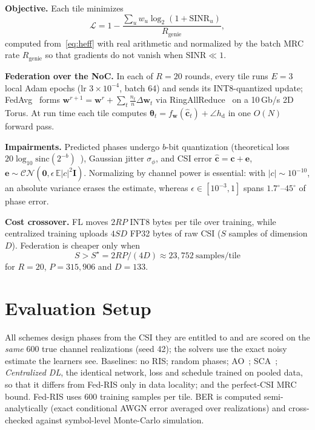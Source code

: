 \documentclass[conference]{IEEEtran}
\newcommand{\fedris}{Fed-RIS\xspace}
\begin{document}
\textbf{Objective.} Each tile minimizes
\begin{equation}
\mathcal{L} = 1 - \frac{\sum_u w_u \log_2(1+\mathrm{SINR}_u)}{R_\text{genie}},
\label{eq:loss}
\end{equation}
computed from~\eqref{eq:heff} with real arithmetic and normalized by the batch MRC rate $R_\text{genie}$ so that gradients do not vanish when $\mathrm{SINR}\ll1$.

\textbf{Federation over the NoC.} In each of $R=20$ rounds, every tile runs $E=3$ local Adam epochs (lr $3\times10^{-4}$, batch 64) and sends its INT8-quantized update; FedAvg~\cite{mcmahan2017} forms $\bm w^{r+1}=\bm w^r+\sum_t \tfrac{n_t}{n}\Delta\bm w_t$ via RingAllReduce~\cite{patarasuk2009} on a 10\,Gb/s 2D Torus. At run time each tile computes $\bm\theta_t=f_{\bm w}(\hat{\bm c}_t)+\angle h_\text{d}$ in one $O(N)$ forward pass.

\textbf{Impairments.} Predicted phases undergo $b$-bit quantization (theoretical loss $20\log_{10}\mathrm{sinc}(2^{-b})$~\cite{wu2020discrete}), Gaussian jitter $\sigma_\phi$, and CSI error $\hat{\bm c}=\bm c+\bm e$, $\bm e\sim\mathcal{CN}(\bm 0,\epsilon\,\mathbb{E}|c|^2\bm I)$. Normalizing by channel power is essential: with $|c|\sim10^{-10}$, an absolute variance erases the estimate, whereas $\epsilon\in[10^{-3},1]$ spans $1.7^\circ$--$45^\circ$ of phase error.

\textbf{Cost crossover.} FL moves $2RP$ INT8 bytes per tile over training, while centralized training uploads $4SD$ FP32 bytes of raw CSI ($S$ samples of dimension $D$). Federation is cheaper only when
\begin{equation}
S > S^\star = 2RP/(4D) \approx 23{,}752 \ \text{samples/tile}
\label{eq:crossover}
\end{equation}
for $R=20$, $P=315{,}906$ and $D=133$.

\section{Evaluation Setup}

All schemes design phases from the CSI they are entitled to and are scored on the \emph{same} 600 true channel realizations (seed 42); the solvers use the exact noisy estimate the learners see. Baselines: no RIS; random phases; AO~\cite{wu2019joint}; SCA~\cite{guo2020}; \emph{Centralized DL}, the identical network, loss and schedule trained on pooled data, so that it differs from \fedris only in data locality; and the perfect-CSI MRC bound. \fedris uses 600 training samples per tile. BER is computed semi-analytically (exact conditional AWGN error averaged over realizations) and cross-checked against symbol-level Monte-Carlo simulation.
\end{document}
